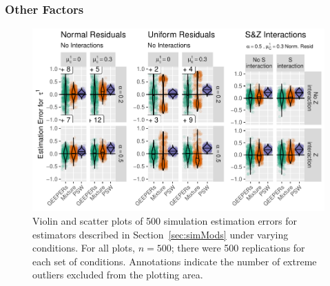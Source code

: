 \documentclass[]{article}
\begin{document}

\subsubsection{Other Factors}


\begin{figure}[!ht]
  \centering
  \includegraphics[width=5.5in,clip]{../simFigs/boxplots.pdf}
  \caption{Violin and scatter plots of 500 simulation estimation errors for estimators described in Section~\ref{sec:simMods} under varying conditions. For all plots, $n=500$; there were 500 replications for each set of conditions. Annotations indicate the number of extreme outliers excluded from the plotting area.}
  \label{fig:boxplots}
\end{figure}
\end{document}

